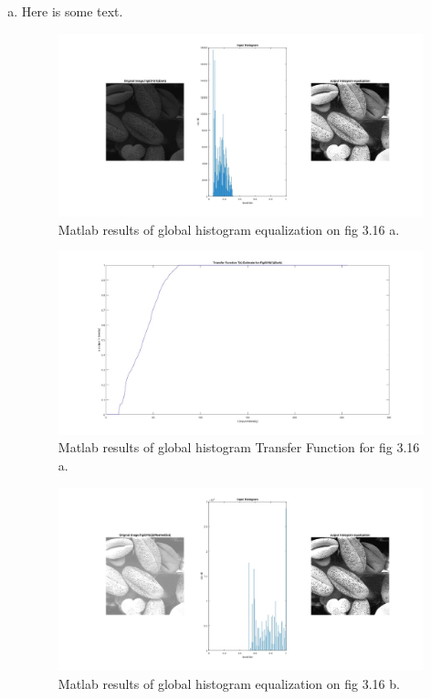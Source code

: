 \documentclass[./rarnold_report2.tex]{subfiles}
\begin{document}
\begin{enumerate}[a.]
	\item 
	Here is some text.
	
	\begin{figure}[!htbp]
	\centering
	\includegraphics[scale=0.25]{"histo1"}
	\caption{Matlab results of global histogram equalization on fig 3.16 a.} 
	\label{histo1}
	\end{figure}
	
	\begin{figure}[!htbp]
	\centering
	\includegraphics[scale=0.25]{"transfer1"}
	\caption{Matlab results of global histogram Transfer Function for fig 3.16 a.} 
	\label{Tr1}
	\end{figure}
	
	\begin{figure}[!htbp]
	\centering
	\includegraphics[scale=0.25]{"histo2"}
	\caption{Matlab results of global histogram equalization on fig 3.16 b.} 
	\label{histo2}
	\end{figure}
	

\end{enumerate}
\end{document}

